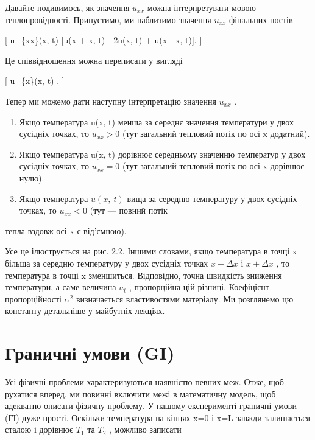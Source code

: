 \documentclass[
  ukrainian,
]{article}
\begin{document}
Давайте подивимось, як значення \(u_{xx}\) можна інтерпретувати мовою
теплопровідності. Припустимо, ми наблизимо значення \(u_{xx}\) фінальних
постів

{[} u\_\{xx\}(x, t) \cong {} {[}u(x + \Delta x, t) -
2u(x, t) + u(x - \Delta x, t){]}. {]}

Це співвідношення можна переписати у вигляді

{[} u\_\{\lambda x\}(x, t) \simeq {}
.
{]}

Тепер ми можемо дати наступну інтерпретацію значення \(u_{xx}\) .

\begin{enumerate}
\def\labelenumi{\arabic{enumi}.}
\item
  Якщо температура u(x, t) менша за середнє значення температури у двох
  сусідніх точках, то \(u_{xx} > 0\) (тут загальний тепловий потік по
  осі x додатний).
\item
  Якщо температура u(x, t) дорівнює середньому значенню температур у
  двох сусідніх точках, то \(u_{xx} = 0\) (тут загальний тепловий потік
  по осі x дорівнює нулю).
\item
  Якщо температура \(u\left(x,\ t\right)\) вища за середню температуру у
  двох сусідніх точках, то \(u_{xx}<0\) (тут --- повний потік
\end{enumerate}

тепла вздовж осі x є від'ємною).

Усе це ілюструється на рис. 2.2. Іншими словами, якщо температура в
точці x більша за середню температуру у двох сусідніх точках
\(x - \Delta x\) і \(x + \Delta x\) , то температура в точці x
зменшиться. Відповідно, точна швидкість зниження температури, а саме
величина \(u_t\) , пропорційна цій різниці. Коефіцієнт пропорційності
\(\alpha^2\) визначається властивостями матеріалу. Ми розглянемо цю
константу детальніше у майбутніх лекціях.

\section{Граничні умови
(GI)}\label{ux433ux440ux430ux43dux438ux447ux43dux456-ux443ux43cux43eux432ux438-gi}

Усі фізичні проблеми характеризуються наявністю певних меж. Отже, щоб
рухатися вперед, ми повинні включити межі в математичну модель, щоб
адекватно описати фізичну проблему. У нашому експерименті граничні умови
(ГІ) дуже прості. Оскільки температура на кінцях x=0 і x=L завжди
залишається сталою і дорівнює \(T_1\) та \(T_2\) , можливо записати
\end{document}
